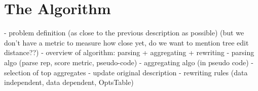 \section{The Algorithm}
\label{sec:algo}

 - problem definition (as close to the previous description as possible) (but we don't
   have a metric to measure how close yet, do we want to mention tree edit distance??)
 - overview of algorithm: parsing + aggregating + rewriting
 - parsing algo (parse rep, score metric, pseudo-code)
 - aggregating algo (in pseudo code)
 - selection of top aggregates
 - update original description
 - rewriting rules (data independent, data dependent, OptsTable)

